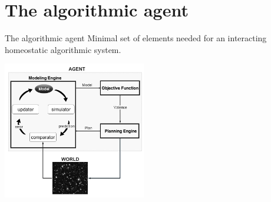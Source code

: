 \section{The algorithmic agent}

\begin{frame}[label=ladila]{The algorithmic agent}
Minimal set of elements needed for an interacting homeostatic algorithmic system. %
 \begin{center}
  \includegraphics[height=6cm]{img/Figure1_StructuredDynamics.png}
  \end{center}

\end{frame}



